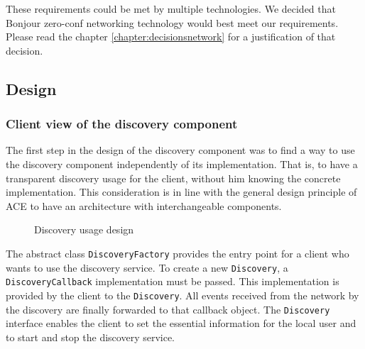 These requirements could be met by multiple technologies. We decided that Bonjour zero-conf networking technology would best meet our requirements. Please read the chapter \ref{chapter:decisionsnetwork} for a justification of that decision.

\subsection{Design}
\subsubsection{Client view of the discovery component}
The first step in the design of the discovery component was to find a way to use the discovery component independently of its implementation. That is, to have a transparent discovery usage for the client, without him knowing the concrete implementation. This consideration is in line with the general design principle of ACE to have an architecture with interchangeable components.

\begin{figure}[H]
 \centering
 \caption{Discovery usage design}
 \label{fig:network.discovery.usage}
\end{figure}

The abstract class  \texttt{DiscoveryFactory} provides the entry point for a client who wants to use the discovery service. To create a new  \texttt{Discovery}, a  \texttt{DiscoveryCallback} implementation must be passed. This implementation is provided by the client to the \texttt{Discovery}. All events received from the network by the discovery are finally forwarded to that callback object. The  \texttt{Discovery} interface enables the client to set the  essential information for the local user and to start and stop the discovery service.

